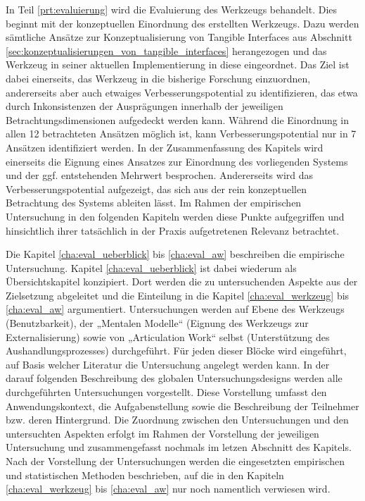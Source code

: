 In Teil \ref{prt:evaluierung} wird die Evaluierung des Werkzeugs behandelt. Dies beginnt mit der konzeptuellen Einordnung des erstellten Werkzeugs. Dazu werden sämtliche Ansätze zur Konzeptualisierung von Tangible Interfaces aus Abschnitt \ref{sec:konzeptualisierungen_von_tangible_interfaces} herangezogen und das Werkzeug in seiner aktuellen Implementierung in diese eingeordnet. Das Ziel ist dabei einerseits, das Werkzeug in die bisherige Forschung einzuordnen, andererseits aber auch etwaiges Verbesserungspotential zu identifizieren, das etwa durch Inkonsistenzen der Ausprägungen innerhalb der jeweiligen Betrachtungsdimensionen aufgedeckt werden kann. Während die Einordnung in allen 12 betrachteten Ansätzen möglich ist, kann Verbesserungspotential nur in 7 Ansätzen identifiziert werden. In der Zusammenfassung des Kapitels wird einerseits die Eignung eines Ansatzes zur Einordnung des vorliegenden Systems und der ggf. entstehenden Mehrwert besprochen. Andererseits wird das Verbesserungspotential aufgezeigt, das sich aus der rein konzeptuellen Betrachtung des Systems ableiten lässt. Im Rahmen der empirischen Untersuchung in den folgenden Kapiteln werden diese Punkte aufgegriffen und hinsichtlich ihrer tatsächlich in der Praxis aufgetretenen Relevanz betrachtet.

Die Kapitel \ref{cha:eval_ueberblick} bis \ref{cha:eval_aw} beschreiben die empirische Untersuchung. Kapitel \ref{cha:eval_ueberblick} ist dabei wiederum als Übersichtskapitel konzipiert. Dort werden die zu untersuchenden Aspekte aus der Zielsetzung abgeleitet und die Einteilung in die Kapitel \ref{cha:eval_werkzeug} bis \ref{cha:eval_aw} argumentiert. Untersuchungen werden auf Ebene des Werkzeugs (Benutzbarkeit), der „Mentalen Modelle“ (Eignung des Werkzeugs zur Externalisierung) sowie von „Articulation Work“ selbst (Unterstützung des Aushandlungsprozesses) durchgeführt. Für jeden dieser Blöcke wird eingeführt, auf Basis welcher Literatur die Untersuchung angelegt werden kann. In der darauf folgenden Beschreibung des globalen Untersuchungsdesigns werden alle durchgeführten Untersuchungen vorgestellt. Diese Vorstellung umfasst den Anwendungskontext, die Aufgabenstellung sowie die Beschreibung der Teilnehmer bzw. deren Hintergrund. Die Zuordnung zwischen den Untersuchungen und den untersuchten Aspekten erfolgt im Rahmen der Vorstellung der jeweiligen Untersuchung und zusammengefasst nochmals im letzen Abschnitt des Kapitels. Nach der Vorstellung der Untersuchungen werden die eingesetzten empirischen und statistischen Methoden beschrieben, auf die in den Kapiteln \ref{cha:eval_werkzeug} bis \ref{cha:eval_aw} nur noch namentlich verwiesen wird.


